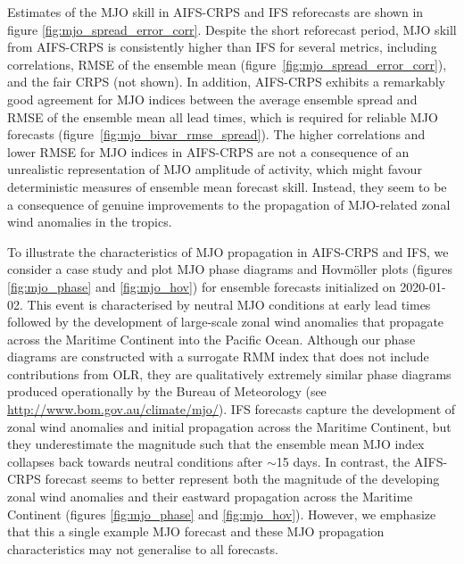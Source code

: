 \documentclass{article}
\begin{document}
Estimates of the MJO skill in AIFS-CRPS and IFS reforecasts are shown in figure \ref{fig:mjo_spread_error_corr}. Despite the short reforecast period, MJO skill from AIFS-CRPS is consistently higher than IFS for several metrics, including correlations, RMSE of the ensemble mean (figure~\ref{fig:mjo_spread_error_corr}), and the fair CRPS (not shown). In addition, AIFS-CRPS exhibits a remarkably good agreement for MJO indices between the average ensemble spread and RMSE of the ensemble mean all lead times, which is required for reliable MJO forecasts (figure~\ref{fig:mjo_bivar_rmse_spread}). The higher correlations and lower RMSE for MJO indices in AIFS-CRPS are not a consequence of an unrealistic representation of MJO amplitude of activity, which might favour deterministic measures of ensemble mean forecast skill. Instead, they seem to be a consequence of genuine improvements to the propagation of MJO-related zonal wind anomalies in the tropics.

To illustrate the characteristics of MJO propagation in AIFS-CRPS and IFS, we consider a case study and plot MJO phase diagrams and Hovm\"{o}ller plots (figures \ref{fig:mjo_phase} and \ref{fig:mjo_hov}) for ensemble forecasts initialized on 2020-01-02. This event is characterised by neutral MJO conditions at early lead times followed by the development of large-scale zonal wind anomalies that propagate across the Maritime Continent into the Pacific Ocean. Although our phase diagrams are constructed with a surrogate RMM index that does not include contributions from OLR, they are qualitatively extremely similar phase diagrams produced operationally by the Bureau of Meteorology (see \url{http://www.bom.gov.au/climate/mjo/}). IFS forecasts capture the development of zonal wind anomalies and initial propagation across the Maritime Continent, but they underestimate the magnitude such that the ensemble mean MJO index collapses back towards neutral conditions after $\sim$15 days. In contrast, the AIFS-CRPS forecast seems to better represent both the magnitude of the developing zonal wind anomalies and their eastward propagation across the Maritime Continent (figures \ref{fig:mjo_phase} and \ref{fig:mjo_hov}). However, we emphasize that this a single example MJO forecast and these MJO propagation characteristics may not generalise to all forecasts. 
\end{document}
